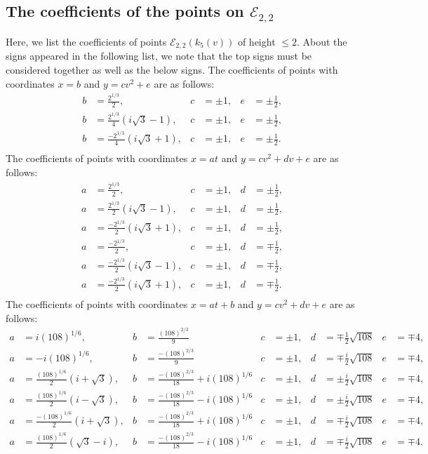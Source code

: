 \documentclass[11pt]{amsart}
\newcommand{\Ee}{{\mathcal E}}
\numberwithin{equation}{section}
\numberwithin{table}{section}
\newcommand\<{\langle}
\begin{document}
\subsection{The coefficients of the points on $\Ee_{2,2}$}
Here, we list the coefficients of  points $\Ee_{2,2}(k_5(v))$ of height $\leq 2$.
About the signs appeared in the following list, we note that the top signs must be considered together as well as the below signs. 
The coefficients of  points with coordinates $x= b$ and $y=c v^2 + e$ are as follows:	
\begin{align*}
	b& = \frac{2^{1/3}}{2}, & c&= \pm 1, & e&= \pm \frac{1}{2},\\
	b& = \frac{2^{1/3}}{4}\left( i \sqrt{3}-1\right) , & c&= \pm 1, & e&= \pm \frac{1}{2},\\
	b& = \frac{-2^{1/3}}{4}\left( i \sqrt{3}+1\right) , & c&= \pm 1, & e&= \pm \frac{1}{2}.\\
\end{align*}	
%
The  coefficients of  points with coordinates $x= a t$ and $y=c v^2 + d v+ e$ are as follows:	
\begin{align*}
	a& = \frac{2^{1/3}}{2}, & c&= \pm 1, & d&= \pm \frac{1}{2},\\
	a& = \frac{2^{1/3}}{2}\left( i \sqrt{3}-1\right), & c&= \pm 1, & d&= \pm \frac{1}{2},\\
	a& = \frac{-2^{1/3}}{2}\left( i \sqrt{3}+1\right), & c&= \pm 1, & d&= \pm \frac{1}{2},\\
	a& = \frac{-2^{1/3}}{2}, & c&= \pm 1, & d&= \mp \frac{1}{2},\\
	a& = \frac{-2^{1/3}}{2}\left( i \sqrt{3}-1\right), & c&= \pm 1, & d&= \mp \frac{1}{2},\\
	a& = \frac{-2^{1/3}}{2}\left( i \sqrt{3}+1\right), & c&= \pm 1, & d&= \mp \frac{1}{2}.\\
\end{align*}
%
The  coefficients of  points with coordinates $x= a t + b$ and $y=c v^2 + d v+ e$ are as follows:
\begin{align*}
	a& = i (108)^{1/6}, & b&=\frac{(108)^{2/3}}{9} & 
	c&= \pm 1, & d&= \mp \frac{1}{2} \sqrt{108} & e & = \mp 4,\\
	a& = -i (108)^{1/6} , & b&=\frac{-(108)^{2/3}}{9} &
	c&= \pm 1, & d&= \mp \frac{i}{2} \sqrt{108} & e & = \mp 4,\\
	a& = \frac{(108)^{1/6}}{2}\left( i +\sqrt{3}\right), & b&=\frac{-(108)^{2/3}}{18}+ i  (108)^{1/6} & c&= \pm 1, & d&= \pm \frac{i}{2} \sqrt{108} & e & = \mp 4,\\
	a& =\frac{(108)^{1/6}}{2}\left( i -\sqrt{3}\right), & b&=\frac{-(108)^{2/3}}{18}- i  (108)^{1/6} & c&= \pm 1, & d&= \pm \frac{i}{2} \sqrt{108} & e & = \mp 4,\\
	a& = \frac{-(108)^{1/6}}{2}\left( i +\sqrt{3}\right), & b&=\frac{-(108)^{2/3}}{18}+ i  (108)^{1/6} & c&= \pm 1, & d&= \mp \frac{i}{2} \sqrt{108} & e & = \mp 4,\\
	a& =\frac{(108)^{1/6}}{2}\left( \sqrt{3}-i\right), & b&=\frac{-(108)^{2/3}}{18}- i  (108)^{1/6} & c&= \pm 1, & d&= \mp \frac{i}{2} \sqrt{108} & e & = \mp 4.
\end{align*}
\fi
 
 

 

{} 
\end{document}
